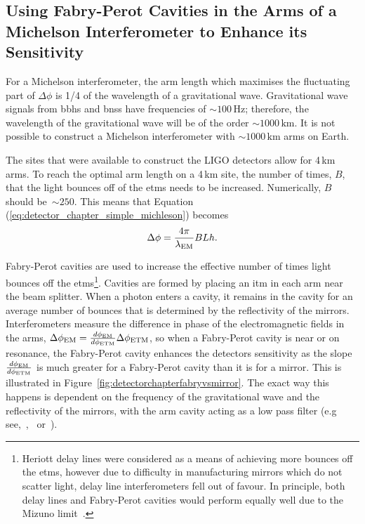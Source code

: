 \subsection{Using Fabry-Perot Cavities in the Arms of a Michelson Interferometer to Enhance its Sensitivity}
For a Michelson interferometer, the arm length which maximises the fluctuating part of $\Delta \phi$ is 1/4 of the wavelength of a gravitational wave. Gravitational wave signals from \glspl{bbh} and \glspl{bns} have frequencies of $\sim\!100\,\si{\hertz}$; therefore, the wavelength of the gravitational wave will be of the order $\sim\!1000\,\si{\kilo\metre}$. It is not possible to construct a Michelson interferometer with $\sim\!1000\,\si{\kilo\metre}$ arms on Earth.
\par
The sites that were available to construct the LIGO detectors allow for 4\,km arms. To reach the optimal arm length on a 4\,km site, the number of times, $B$, that the light bounces off of the \glspl{etm} needs to be increased. Numerically, $B$ should be~$\sim\!250$. This means that Equation (\ref{eq:detector_chapter_simple_michleson}) becomes
\begin{equation}
\Delta \phi = \frac{4\pi}{\lambda_{\rm{EM}}}BLh.
\label{eq:detector_chapter_michleson_with_bounces}
\end{equation}
\par
Fabry-Perot cavities are used to increase the effective number of times light bounces off the \glspl{etm}\footnote{Heriott delay lines were considered as a means of achieving more bounces off the \glspl{etm}, however due to difficulty in manufacturing mirrors which do not scatter light, delay line interferometers fell out of favour. In principle, both delay lines and Fabry-Perot cavities would perform equally well due to the Mizuno limit~\cite{Mizuno1995}.}. Cavities are formed by placing an \gls{itm} in each arm near the beam splitter. When a photon enters a cavity, it remains in the cavity for an average number of bounces that is determined by the reflectivity of the mirrors. Interferometers measure the difference in phase of the electromagnetic fields in the arms, $\Delta \phi_{\rm{EM}} = \frac{d \phi_{\rm{EM}}}{d \phi_{\rm{ETM}}} \Delta \phi_{\rm{ETM}}$, so when a Fabry-Perot cavity is near or on resonance, the Fabry-Perot cavity enhances the detectors sensitivity as the slope $\frac{d \phi_{\rm{EM}}}{d \phi_{\rm{ETM}}}$ is much greater for a Fabry-Perot cavity than it is for a mirror. This is illustrated in Figure~\ref{fig:detectorchapterfabryvsmirror}. The exact way this happens is dependent on the frequency of the gravitational wave and the reflectivity of the mirrors, with the arm cavity acting as a low pass filter (e.g~ see\cite[Chapter 3]{Mizuno1995},~\cite[Appendix D]{Heinzel1999},~\cite{Meers1989} or~\cite{Bond2016}).
